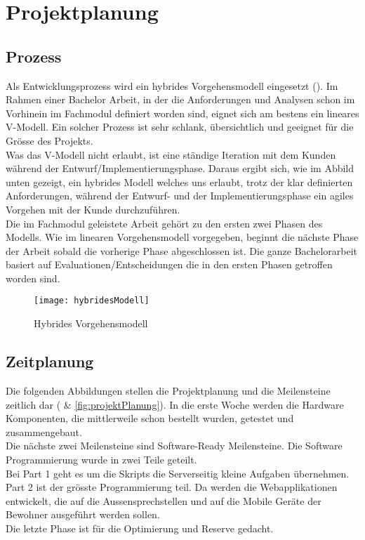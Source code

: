 \section{Projektplanung}
\label{sec:chapterexample}

\subsection{Prozess}
\label{sec:chapterexample}

Als Entwicklungsprozess wird ein hybrides Vorgehensmodell eingesetzt (). Im Rahmen einer Bachelor Arbeit, in der die Anforderungen und Analysen schon im Vorhinein im Fachmodul definiert worden sind, eignet sich am bestens ein lineares V-Modell. Ein solcher Prozess ist sehr schlank, übersichtlich und geeignet für die Grösse des Projekts.
\\
Was das V-Modell nicht erlaubt, ist eine ständige Iteration mit dem Kunden während der Entwurf/Implementierungsphase. Daraus ergibt sich, wie im Abbild unten gezeigt, ein hybrides Modell welches uns erlaubt, trotz der klar definierten Anforderungen, während der Entwurf- und der Implementierungsphase ein agiles Vorgehen mit der Kunde durchzuführen.
\\
Die im Fachmodul geleistete Arbeit gehört zu den ersten zwei Phasen des Modells. Wie im linearen Vorgehensmodell vorgegeben, beginnt die nächste Phase der Arbeit sobald die vorherige Phase abgeschlossen ist. Die ganze Bachelorarbeit basiert auf Evaluationen/Entscheidungen die in den ersten Phasen getroffen worden sind.  

\begin{figure}[htb!]
	\begin{center}
		\texttt{[image: hybridesModell]}
		\caption[Hybrides Vorgehensmodell]{Hybrides Vorgehensmodell}
		\label{fig:hybridesModell}
	\end{center}
\end{figure}


\subsection{Zeitplanung}
\label{sec:chapterexample}

Die folgenden Abbildungen stellen die Projektplanung und die Meilensteine zeitlich dar ( \& \cref{fig:projektPlanung}). In die erste Woche werden die Hardware Komponenten, die mittlerweile schon bestellt wurden, getestet und zusammengebaut.
\\
Die nächste zwei Meilensteine sind Software-Ready Meilensteine. Die Software Programmierung wurde in zwei Teile geteilt.
\\ 
Bei Part 1 geht es um die Skripts die Serverseitig kleine Aufgaben übernehmen. Part 2 ist der grösste Programmierung teil. Da werden die Webapplikationen entwickelt, die auf die Aussensprechstellen und auf die Mobile Geräte der Bewohner ausgeführt werden sollen.
\\
Die letzte Phase ist für die Optimierung und Reserve gedacht.

